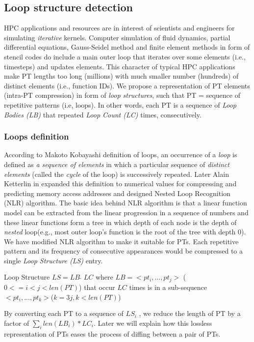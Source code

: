 \subsection{Loop structure detection}
\label{subsec:nlr}

HPC applications and resources are in interest of scientists and engineers for simulating \textit{iterative} kernels. Computer simulation of fluid dynamics, partial differential equations, Gauss-Seidel method and finite element methods in form of stencil codes do include a main outer loop that iterates over some elements (i.e., timesteps) and updates elements.
%
This character of typical HPC applications make PT lengths too long (millions) with much smaller number (hundreds) of distinct elements  (i.e., function IDs).
%
We propose a representation of PT elements (intra-PT compression) in form of \textit{loop structures}, such that PT = sequence of repetitive patterns (i.e, loops). In other words, each PT is a sequence of \textit{Loop Bodies (LB)} that repeated \textit{Loop Count (LC)} times, consecutively.
%


\subsubsection{Loops definition}

According to Makoto Kobayashi\cite{kobayashi-84} definition of loops, an occurrence of a \textit{loop} is defined as \textit{a sequence of elements} in which a particular sequence of \textit{distinct elements} (called the \textit{cycle} of the loop) is successively repeated.
%
Later Alain Ketterlin in \cite{Ketterlin-nlr} expanded this definition to numerical values for compressing and predicting memory access addresses and designed Nested Loop Recognition (NLR) algorithm.
%
The basic idea behind NLR algorithm is that a linear function model can be extracted from the linear progression in a sequence of numbers and these linear functions form a tree in which depth of each node is the depth of \textit{nested} loop(e.g., most outer loop's function is the root of the tree with depth 0).
%
We have modified NLR algorithm to make it suitable for PTs.
%
Each repetitive pattern and its frequency of consecutive appearances would be compressed to a single \textit{Loop Structure (LS)} entry.
%
\begin{definition}{Loop Structure} $LS = LB \; \hat{} \; LC$ where $LB  = <pt_i,...,pt_j>$ ($0<= i < j < len(PT)$) that occur $LC$ times is in a sub-sequence $ <pt_i,...,pt_k>$($k = 3j, k<len(PT)$)

\end{definition}
%
By converting each PT to a sequence of $LS_i$ , we reduce the length of PT by a factor of $\sum_i len(LB_i) * LC_i$.
%
Later we will explain how this lossless representation of PTs eases the process of diffing between a pair of PTs.

